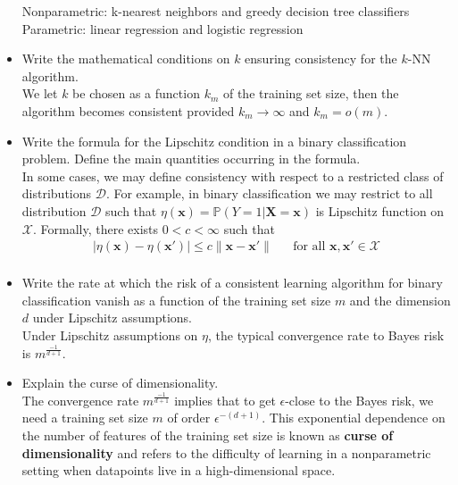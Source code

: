 \begin{itemize}
        Nonparametric: k-nearest neighbors and greedy decision tree classifiers\\
        Parametric: linear regression and logistic regression\\

    \item Write the mathematical conditions on $k$ ensuring consistency for the $k$-NN algorithm.\\

        We let $k$ be chosen as a function $k_m$ of the training set size, then the algorithm becomes consistent provided $k_m \rightarrow \infty$ and $k_m = o(m)$.\\
        
    \item Write the formula for the Lipschitz condition in a binary classification problem. Define the main quantities occurring in the formula.\\

        In some cases, we may define consistency with respect to a restricted class of distributions $\mathcal{D}$. For example, in binary classification we may restrict to all distribution $\mathcal{D}$ such that $\eta(\boldsymbol{x}) = \mathbb{P}(Y = 1 | \boldsymbol{X} = \boldsymbol{x})$ is Lipschitz function on $\mathcal{X}$. Formally, there exists $0 < c < \infty$ such that
        \begin{equation} 
            \begin{aligned}
                |\eta(\boldsymbol{x}) - \eta(\boldsymbol{x}')| \leq c \|\boldsymbol{x} - \boldsymbol{x}'\| && \text{for all $\boldsymbol{x}, \boldsymbol{x}' \in \mathcal{X}$} \\ 
            \end{aligned}
        \end{equation}

    \item Write the rate at which the risk of a consistent learning algorithm for binary classification vanish as a function of the training set size $m$ and the dimension $d$ under Lipschitz assumptions.\\

        Under Lipschitz assumptions on $\eta$, the typical convergence rate to Bayes risk is $m^{\frac{-1}{d+1}}$.\\

    \item Explain the curse of dimensionality.\\
    
        The convergence rate $m^{\frac{-1}{d+1}}$ implies that to get $\epsilon$-close to the Bayes risk, we need a training set size $m$ of order $\epsilon^{-(d+1)}$. This exponential dependence on the number of features of the training set size is known as \textbf{curse of dimensionality} and refers to the difficulty of learning in a nonparametric setting when datapoints live in a high-dimensional space.\\
    

\end{itemize}
